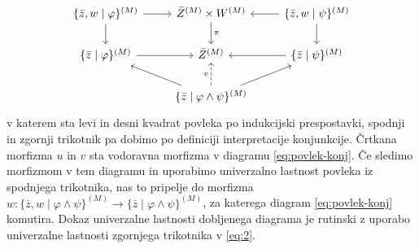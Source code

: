\documentclass[../kategoricna_logika.tex]{subfiles}
\begin{document}
\begin{dokaz}
\begin{itemize}
\begin{equation}
\begin{tikzcd}
    \{\bar{z},w \mid \varphi \}^{(M)} \ar[d] \ar[r] & \bar{Z}^{(M)} \times W^{(M)} \ar[d, "\pi"] & \{\bar{z}, w \mid \psi\}^{(M)} \ar[l] \ar[d] \\
    \{\bar{z} \mid \varphi \}^{(M)} \ar[r] & \bar{Z}^{(M)} & \{\bar{z} \mid \psi \}^{(M)} \ar[l] \\
    & \{\bar{z} \mid \varphi \land \psi \}^{(M)} \ar[ul] \ar[u, dashed, "v"] \ar[ur] &
  \end{tikzcd}
\end{equation}
v katerem sta levi in desni kvadrat povleka po indukcijski prespostavki, spodnji in zgornji trikotnik
pa dobimo po definiciji interpretacije konjunkcije. Črtkana morfizma $u$ in $v$ sta vodoravna morfizma
v diagramu \eqref{eq:povlek-konj}. Če sledimo morfizmom v tem diagramu in uporabimo univerzalno lastnost
povleka iz spodnjega trikotnika, nas to pripelje do morfizma $w : \{\bar{z},w \mid \varphi \land \psi\}^{(M)} \to \{\bar{z} \mid \varphi \land \psi\}^{(M)}$, za katerega diagram \eqref{eq:povlek-konj} komutira.
Dokaz univerzalne lastnosti dobljenega diagrama je rutinski z uporabo univerzalne lastnosti zgornjega trikotnika
v \eqref{eq:2}.


\end{itemize}
\end{dokaz}
\end{document}
